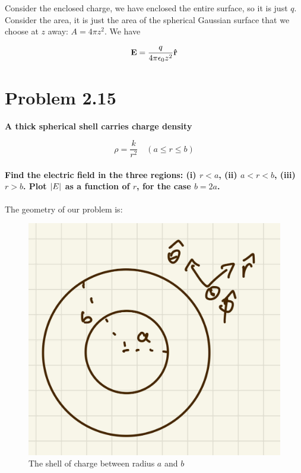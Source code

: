 \documentclass{article}
\numberwithin{equation}{section}
\numberwithin{figure}{section}
\newcommand{\vbh}[1]{\vb{\hat{#1}}}
\begin{document}
Consider the enclosed charge, we have enclosed the entire surface, so it is just $q$. Consider the area, it is just the area of the spherical Gaussian surface that we choose at $z$ away: $A = 4 \pi z^2$. We have

\begin{equation}
    \vb{E} = \frac{q}{4 \pi \epsilon_0 z^2} \vbh r
\end{equation}

\section{Problem 2.15}

\textbf{A thick spherical shell carries charge density}

\begin{equation*}
    \rho = \frac{k}{r^2} \quad ( a \leq r \leq b)
\end{equation*}

\paragraph{Find the electric field in the three regions: (i) $r < a$, (ii) $a < r < b$, (iii)
$ r > b$. Plot $\abs{E}$ as a function of $r$, for the case $b = 2a$. \\}

The geometry of our problem is:

\begin{figure}[!htb]
    \centering
   \begin{minipage}{0.48\textwidth}
     \includegraphics[width=.7\linewidth]{hw/hw2/3.1.jpg}
     \caption{The shell of charge between radius $a$ and $b$}
   \end{minipage}
\end{figure}
\end{document}

